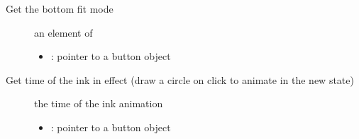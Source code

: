 \documentclass[letterpaper,10pt,english]{sphinxmanual}
\begin{document}

\begin{fulllineitems}
\label{\detokenize{object-types/btn:_CPPv421lv_btn_get_fit_bottomPK8lv_obj_t}}%
\pysigstartmultiline
{}\label{\detokenize{object-types/btn:lv__btn_8h_1a049ef6780b716f82d921974fe14227e9}}%
\pysigstopmultiline
Get the bottom fit mode \begin{description}
\item[{}] \leavevmode
an element of  

\item[{}] \leavevmode\begin{itemize}
\item {} 
: pointer to a button object 

\end{itemize}

\end{description}


\end{fulllineitems}


\begin{fulllineitems}
\label{\detokenize{object-types/btn:_CPPv422lv_btn_get_ink_in_timePK8lv_obj_t}}%
\pysigstartmultiline
{}\label{\detokenize{object-types/btn:lv__btn_8h_1add989326f393eab8880631d423730240}}%
\pysigstopmultiline
Get time of the ink in effect (draw a circle on click to animate in the new state) \begin{description}
\item[{}] \leavevmode
the time of the ink animation 

\item[{}] \leavevmode\begin{itemize}
\item {} 
: pointer to a button object 

\end{itemize}

\end{description}


\end{fulllineitems}
\end{document}
